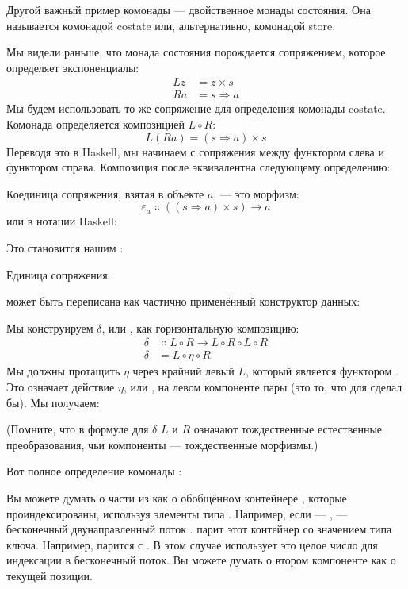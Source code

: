Другой важный пример комонады --- двойственное монады состояния.
Она называется комонадой costate или, альтернативно, комонадой store.

Мы видели раньше, что монада состояния порождается сопряжением,
которое определяет экспоненциалы:
\begin{align*}
  L z & = z\times{}s      \\
  R a & = s \Rightarrow a
\end{align*}
Мы будем использовать то же сопряжение для определения комонады costate. Комонада
определяется композицией $L \circ R$:
\[L (R a) = (s \Rightarrow a)\times{}s\]
Переводя это в Haskell, мы начинаем с сопряжения между
функтором  слева и функтором 
справа. Композиция  после  эквивалентна
следующему определению:

Коединица сопряжения, взятая в объекте $a$, --- это
морфизм:
\[\varepsilon_a \Colon ((s \Rightarrow a)\times{}s) \to a\]
или в нотации Haskell:

Это становится нашим :

Единица сопряжения:

может быть переписана как частично применённый конструктор данных:

Мы конструируем $\delta$, или , как горизонтальную композицию:
\begin{align*}
  \delta & \Colon L \circ R \to L \circ R \circ L \circ R \\
  \delta & = L \circ \eta \circ R
\end{align*}
Мы должны протащить $\eta$ через крайний левый $L$, который является
функтором . Это означает действие $\eta$, или , на
левом компоненте пары (это то, что  для
 сделал бы). Мы получаем:

(Помните, что в формуле для $\delta$ $L$ и $R$ означают
тождественные естественные преобразования, чьи компоненты ---
тождественные морфизмы.)

Вот полное определение комонады :

Вы можете думать о части  из  как о
обобщённом контейнере , которые проиндексированы, используя элементы
типа . Например, если  --- ,
 --- бесконечный двунаправленный поток
.  парит этот контейнер со значением типа ключа.
Например,  парится с
. В этом случае  использует это целое число для индексации
в бесконечный поток. Вы можете думать о втором компоненте
 как о текущей позиции.

